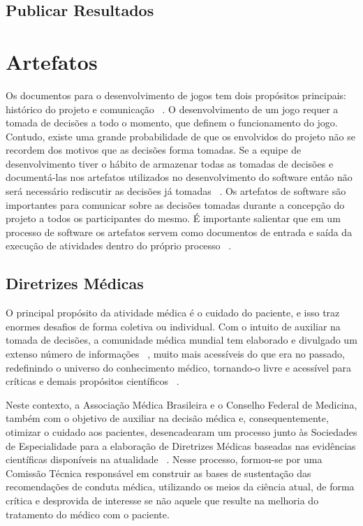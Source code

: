 
\subsection{Publicar Resultados}
\section{Artefatos}

Os documentos para o desenvolvimento de jogos tem dois propósitos principais: histórico do projeto e comunicação ~\cite{schell2008art}. O desenvolvimento de um jogo requer a tomada de decisões a todo o momento, que definem o funcionamento do jogo. Contudo, existe uma grande probabilidade de que os envolvidos do projeto não se recordem dos motivos que as decisões forma tomadas. Se a equipe de desenvolvimento tiver o hábito de armazenar todas as tomadas de decisões e documentá-las nos artefatos utilizados no desenvolvimento do software então não será necessário rediscutir as decisões já tomadas ~\cite{schell2008art}.
Os artefatos de software são importantes para comunicar sobre as decisões tomadas durante a concepção do projeto a todos os participantes do mesmo. É importante salientar que em um processo de software os artefatos servem como documentos de entrada e saída da execução de atividades dentro do próprio processo ~\cite{sommerville2011}.

\subsection{Diretrizes Médicas}\label{subsec:diretrizes_medicas}
O principal propósito da atividade médica é o cuidado do paciente, e isso traz enormes desafios de forma coletiva ou individual. Com o intuito de auxiliar na tomada de decisões, a comunidade médica mundial tem elaborado e divulgado um extenso número de informações ~\cite{nhs2013,neozeland-guide-2013}, muito mais acessíveis do que era no passado, redefinindo o universo do conhecimento médico, tornando-o livre e acessível para críticas e demais propósitos científicos ~\cite{proj-diretriz2013}.

Neste contexto, a Associação Médica Brasileira e o Conselho Federal de Medicina, também com o objetivo de auxiliar na decisão médica e, consequentemente, otimizar o cuidado aos pacientes, desencadearam um processo junto às Sociedades de Especialidade para a elaboração de Diretrizes Médicas baseadas nas evidências científicas disponíveis na atualidade ~\cite{proj-diretriz2013}.
Nesse processo, formou-se por uma Comissão Técnica responsável em construir as bases de sustentação das recomendações de conduta médica, utilizando os meios da ciência atual, de forma crítica e desprovida de interesse se não aquele que resulte na melhoria do tratamento do médico com o paciente. 

